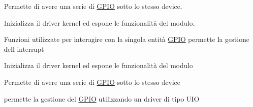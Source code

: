 Permette di avere una serie di \hyperlink{structGPIO}{G\+P\+IO} sotto lo stesso device.

Inizializza il driver kernel ed espone le funzionalità del modulo.

Funzioni utilizzate per interagire con la singola entità \hyperlink{structGPIO}{G\+P\+IO} permette la gestione dell\textquotesingle{} interrupt

Inizializza il driver kernel ed espone le funzionalità del modulo

Permette di avere una serie di \hyperlink{structGPIO}{G\+P\+IO} sotto lo stesso device

permette la gestione del \hyperlink{structGPIO}{G\+P\+IO} utilizzando un driver di tipo U\+IO 